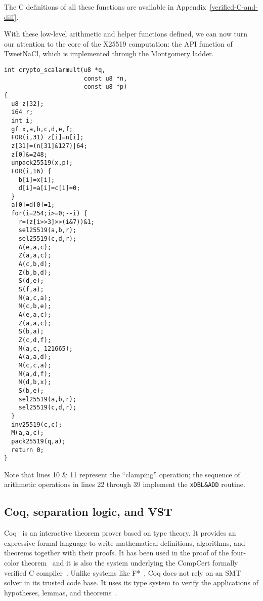 The C definitions of all these functions are available in
Appendix~\ref{verified-C-and-diff}.

With these low-level arithmetic and helper functions defined,
we can now turn our attention to the core of the X25519 computation:
the  API function of TweetNaCl,
which is implemented through the Montgomery ladder.

\begin{lstlisting}[language=Ctweetnacl]
int crypto_scalarmult(u8 *q,
                      const u8 *n,
                      const u8 *p)
{
  u8 z[32];
  i64 r;
  int i;
  gf x,a,b,c,d,e,f;
  FOR(i,31) z[i]=n[i];
  z[31]=(n[31]&127)|64;
  z[0]&=248;
  unpack25519(x,p);
  FOR(i,16) {
    b[i]=x[i];
    d[i]=a[i]=c[i]=0;
  }
  a[0]=d[0]=1;
  for(i=254;i>=0;--i) {
    r=(z[i>>3]>>(i&7))&1;
    sel25519(a,b,r);
    sel25519(c,d,r);
    A(e,a,c);
    Z(a,a,c);
    A(c,b,d);
    Z(b,b,d);
    S(d,e);
    S(f,a);
    M(a,c,a);
    M(c,b,e);
    A(e,a,c);
    Z(a,a,c);
    S(b,a);
    Z(c,d,f);
    M(a,c,_121665);
    A(a,a,d);
    M(c,c,a);
    M(a,d,f);
    M(d,b,x);
    S(b,e);
    sel25519(a,b,r);
    sel25519(c,d,r);
  }
  inv25519(c,c);
  M(a,a,c);
  pack25519(q,a);
  return 0;
}
\end{lstlisting}

Note that lines 10 \& 11 represent the ``clamping'' operation;
the sequence of arithmetic operations in lines 22 through 39 implement the 
\texttt{xDBL\&ADD} routine.

\subsection{Coq, separation logic, and VST}
\label{subsec:Coq-VST}

Coq~\cite{coq-faq} is an interactive theorem prover based on type theory. It
provides an expressive formal language to write mathematical definitions,
algorithms, and theorems together with their proofs. It has been used in the proof
of the four-color theorem~\cite{gonthier2008formal} and it is also the system
underlying the CompCert formally verified C compiler~\cite{Leroy-backend}.
Unlike systems like F*~\cite{DBLP:journals/corr/BhargavanDFHPRR17},
Coq does not rely on an SMT solver in its trusted code base.
It uses its type system to verify the applications of hypotheses,
lemmas, and theorems~\cite{Howard1995-HOWTFN}.

